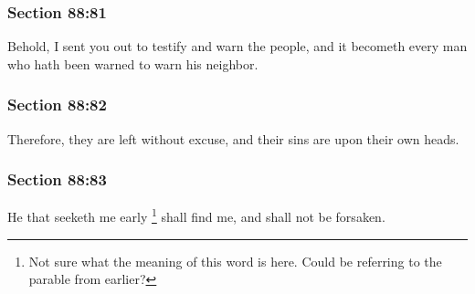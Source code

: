 	\subsubsection{Section 88:81} %
		\label{DC88-81}

		Behold, I sent you out to testify and warn the people, and it becometh every man who hath been warned to warn his neighbor.


	\subsubsection{Section 88:82} %
		\label{DC88-82}

		Therefore, they are left without excuse, and their sins are upon their own heads.


	\subsubsection{Section 88:83} %
		\label{DC88-83}

		He that seeketh me early%
			\footnote{%
				Not sure what the meaning of this word is here. Could be referring to the parable from earlier?
				}
		shall find me, and shall not be forsaken.


